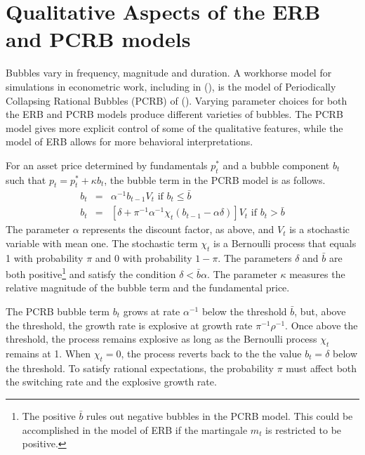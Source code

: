 \documentclass[12pt]{article}
\begin{document}
\section{Qualitative Aspects of the ERB and PCRB models}

Bubbles vary in frequency, magnitude and duration. A workhorse model for simulations in econometric work, including in \citeauthor{phillips2015testing} (\citeyear{phillips2015testing}), is the model of Periodically Collapsing Rational Bubbles (PCRB) of \citeauthor{evans1991pitfalls} (\citeyear{evans1991pitfalls}). Varying parameter choices for both the ERB and PCRB models produce different varieties of bubbles. The PCRB model gives more explicit control of some of the qualitative features, while the model of ERB allows for more behavioral interpretations.

For an asset price determined by fundamentals $p^{*}_{t}$ and a bubble component $b_{t}$ such that $p_{t}=p^{*}_{t}+\kappa b_{t}$, the
bubble term in the PCRB model is as follows.
\begin{eqnarray*}
b_{t} &=&\alpha ^{-1}b_{t-1}V_{t}\text{ \ \ \ \ if }b_{t}\leq \bar{b} \\
b_{t} &=&\left[ \delta +\pi ^{-1}\alpha ^{-1}\chi _{t}\left( b_{t-1}-\alpha\delta \right) \right] V_{t}\text{ \ \ \ \ if }b_{t}>\bar{b}
\end{eqnarray*}%
The parameter $\alpha $ represents the discount factor, as above, and $V_{t}$ is a stochastic variable with mean one. The stochastic term $\chi_{t}$ is a Bernoulli process that equals 1 with probability $\pi$ and 0 with probability $1-\pi$. The parameters $\delta$ and $\bar{b}$ are both positive\footnote{The positive $\bar{b}$ rules out negative bubbles in the PCRB model. This could be accomplished in the model of ERB if the martingale $m_{t}$ is restricted to be positive.} and satisfy the condition $\delta < \bar{b}\alpha$. The parameter $\kappa$ measures the relative magnitude of the bubble term and the fundamental price.

The PCRB bubble term $b_{t}$ grows at rate $\alpha^{-1}$ below the threshold $\bar{b}$, but, above the threshold, the growth rate is explosive at growth rate $\pi ^{-1}\rho ^{-1}$. Once above the threshold, the process remains explosive as long as the Bernoulli process $\chi_{t}$ remains at 1. When $\chi_{t}=0$, the process reverts back to the the value $b_{t}=\delta$ below the threshold. To satisfy rational expectations, the probability $\pi$ must affect both the switching rate and the explosive growth rate.
 
\end{document}
